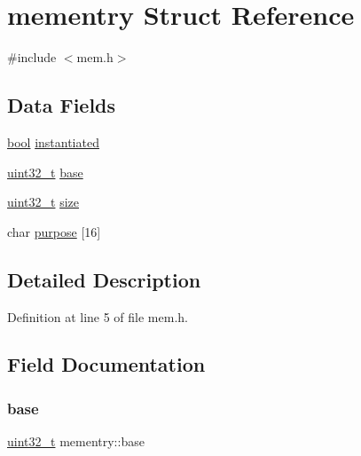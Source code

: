 \hypertarget{a00164}{}\section{mementry Struct Reference}
\label{a00164}


{\ttfamily \#include $<$mem.\+h$>$}

\subsection*{Data Fields}
\begin{DoxyCompactItemize}
\item 
\hyperlink{a00095_af6a258d8f3ee5206d682d799316314b1_af6a258d8f3ee5206d682d799316314b1}{bool} \hyperlink{a00164_a4342b85bc8bdb60635df7a30e1d30fa2_a4342b85bc8bdb60635df7a30e1d30fa2}{instantiated}
\item 
\hyperlink{a00095_a435d1572bf3f880d55459d9805097f62_a435d1572bf3f880d55459d9805097f62}{uint32\+\_\+t} \hyperlink{a00164_ad6175fdf80547c655c7f35cff7ff82f9_ad6175fdf80547c655c7f35cff7ff82f9}{base}
\item 
\hyperlink{a00095_a435d1572bf3f880d55459d9805097f62_a435d1572bf3f880d55459d9805097f62}{uint32\+\_\+t} \hyperlink{a00164_a9a3a95abc18136ba568cd9d5e594c5c6_a9a3a95abc18136ba568cd9d5e594c5c6}{size}
\item 
char \hyperlink{a00164_a5ad2dd8cc879cbc1bc76459b1b314c81_a5ad2dd8cc879cbc1bc76459b1b314c81}{purpose} \mbox{[}16\mbox{]}
\end{DoxyCompactItemize}


\subsection{Detailed Description}


Definition at line 5 of file mem.\+h.



\subsection{Field Documentation}
\mbox{\label{a00164_ad6175fdf80547c655c7f35cff7ff82f9_ad6175fdf80547c655c7f35cff7ff82f9}} 
\subsubsection{\texorpdfstring{base}{base}}
{\footnotesize\ttfamily \hyperlink{a00095_a435d1572bf3f880d55459d9805097f62_a435d1572bf3f880d55459d9805097f62}{uint32\+\_\+t} mementry\+::base}



